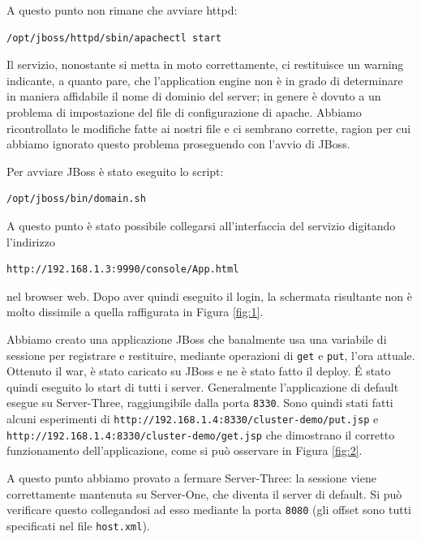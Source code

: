 \documentclass[twoside]{article}
\begin{document}
A questo punto non rimane che avviare httpd:
\begin{lstlisting}[frame=trBL]
/opt/jboss/httpd/sbin/apachectl start
\end{lstlisting}

Il servizio, nonostante si metta in moto correttamente, ci restituisce un warning indicante, a quanto pare,
che l'application engine non è in grado di determinare in maniera affidabile il nome di dominio del server;
in genere è dovuto a un problema di impostazione del file di configurazione di apache. Abbiamo ricontrollato
le modifiche fatte ai nostri file e ci sembrano corrette, ragion per cui abbiamo ignorato questo problema
proseguendo con l'avvio di JBoss.

Per avviare JBoss è stato eseguito lo script:
\begin{lstlisting}[frame=trBL]
/opt/jboss/bin/domain.sh
\end{lstlisting}

A questo punto è stato possibile collegarsi all'interfaccia del servizio digitando l'indirizzo
\begin{lstlisting}[frame=trBL]
http://192.168.1.3:9990/console/App.html
\end{lstlisting}
nel browser web. Dopo aver quindi eseguito il login, la
schermata risultante non è molto dissimile a quella raffigurata in Figura \ref{fig:1}.

Abbiamo creato una applicazione JBoss che banalmente usa una variabile di sessione per registrare
e restituire, mediante operazioni di \texttt{get} e \texttt{put}, l'ora attuale. Ottenuto il war,
è stato caricato su JBoss e ne è stato fatto il deploy. \'{E} stato quindi eseguito lo start di
tutti i server. Generalmente l'applicazione di default esegue su Server-Three, raggiungibile dalla
porta \texttt{8330}. Sono quindi stati fatti alcuni esperimenti di 
\texttt{http://192.168.1.4:8330/cluster-demo/put.jsp} e 
\texttt{http://192.168.1.4:8330/cluster-demo/get.jsp} che dimostrano il corretto funzionamento
dell'applicazione, come si può osservare in Figura \ref{fig:2}.

A questo punto abbiamo provato a fermare Server-Three: la sessione viene correttamente mantenuta
su Server-One, che diventa il server di default. Si può verificare questo collegandosi ad esso
mediante la porta \texttt{8080} (gli offset sono tutti specificati nel file \texttt{host.xml}).
\end{document}

